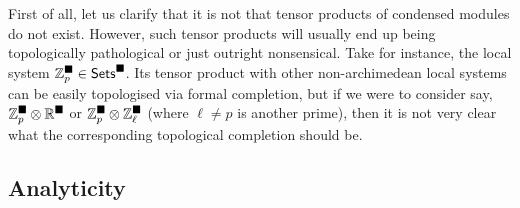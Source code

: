             First of all, let us clarify that it is not that tensor products of condensed modules do not exist. However, such tensor products will usually end up being topologically pathological or just outright nonsensical. Take for instance, the local system $\mathbb{Z}_p^{\blacksquare} \in \mathsf{Sets}^{\blacksquare}$. Its tensor product with other non-archimedean local systems can be easily topologised via formal completion, but if we were to consider say, $\Z_p^{\cond} \tensor \R^{\cond}$ or $\Z_p^{\cond} \tensor \Z_{\ell}^{\cond}$ (where $\ell \not = p$ is another prime), then it is not very clear what the corresponding topological completion should be.  
            
            
        
        \subsection{Analyticity}